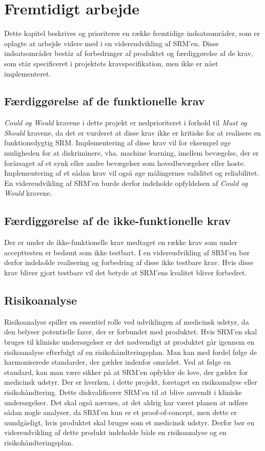 \chapter{Fremtidigt arbejde}

Dette kapitel beskrives og prioriteres en række fremtidige indsatsområder, som er oplagte at arbejde videre med i en videreudvikling af SRM'en. Disse indsatsområder består af forbedringer af produktet og færdiggørelse af de krav, som står specificeret i projektets kravspecifikation, men ikke er nået implementeret.  


\section{Færdiggørelse af de funktionelle krav}
\textit{Could og Would} kravene i dette projekt er nedprioriteret i forhold til \textit{Must og Should} kravene, da det er vurderet at disse krav ikke er kritiske for at realisere en funktionsdygtig SRM. Implementering af disse krav vil for eksempel øge muligheden for at diskriminere, vha. machine learning, imellem bevægelse, der er forårsaget af et synk eller andre bevægelser som hovedbevægelser eller hoste. Implementering af et sådan krav vil også øge målingernes validitet og reliabilitet. En videreudvikling af SRM'en burde derfor indeholde opfyldelsen af \textit{Could og Would} kravene.   

\section{Færdiggørelse af de ikke-funktionelle krav}
Der er under de ikke-funktionelle krav medtaget en række krav som under accepttesten er bedømt som ikke testbart. I en videreudvikling af SRM'en bør derfor indeholde realisering og forbedring af disse ikke testbare krav. Hvis disse krav bliver gjort testbare vil det betyde at SRM'ens kvalitet bliver forbedret.    

\section{Risikoanalyse}
Risikoanalyse spiller en essentiel rolle ved udviklingen af medicinsk udstyr, da den belyser potentielle farer, der er forbundet med produktet. Hvis SRM'en skal bruges til kliniske undersøgelser er det nødvendigt at produktet går igennem en risikoanalyse efterfulgt af en risikohåndteringsplan. Man kan med fordel følge de harmoniserede standarder, der gælder indenfor området. Ved at følge en standard, kan man være sikker på at SRM'en opfylder de love, der gælder for medicinsk udstyr. Der er hverken, i dette projekt, foretaget en risikoanalyse eller risikohåndtering. Dette diskvalificerer SRM'en til at blive anvendt i kliniske undersøgelser. Det skal også nævnes, at det aldrig har været planen at udføre sådan nogle analyser, da SRM'en kun er et proof-of-concept, men dette er uundgåeligt, hvis produktet skal bruges som et medicinsk udstyr. Derfor bør en videreudvikling af dette produkt indeholde både en risikoanalyse og en risikohåndteringsplan.    
 
